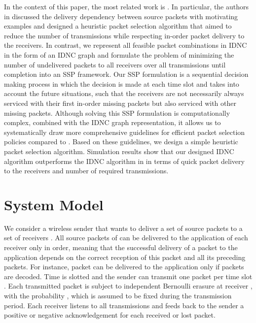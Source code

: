 \documentclass[12pt, peerreview, onecolumn]{IEEEtran}
\begin{document}
In the context of this paper, the most related work is \cite{wanginstantly}. In particular,  the authors in \cite{wanginstantly}  discussed the  delivery dependency between source packets with motivating examples  and  designed a heuristic packet selection algorithm that aimed to reduce the number of  transmissions  while respecting in-order packet delivery to the receivers. In contrast, we  represent all feasible packet combinations in IDNC in the form of an IDNC graph and formulate the problem of minimizing the  number of  undelivered packets to all receivers over all transmissions until completion into an SSP framework.  Our SSP formulation is a sequential decision making process in which  the decision is made at each time slot and  takes into account the future situations,  such that the  receivers  are not necessarily always serviced with their  first in-order missing packets but  also serviced with  other missing packets. Although solving this SSP formulation is computationally  complex,  combined with the IDNC graph representation, it allows us to systematically   draw more comprehensive
 guidelines  for  efficient packet selection policies compared to \cite{wanginstantly}. Based on these guidelines, we design  a simple heuristic packet selection  algorithm. Simulation results show that our designed IDNC algorithm  outperforms the IDNC algorithm in \cite{wanginstantly} in terms of quick packet   delivery  to the receivers and number of required transmissions.





\vspace{-5mm}
\section{System Model} \label{tools}
We consider a wireless sender that wants to  deliver a set   of  source packets   to a set  of  receivers .\footnotemark {} All source packets of  can be delivered to the application of each receiver only in order,  meaning that the successful delivery of a packet to the application  depends on the correct reception of this packet and all its preceding packets. For instance, packet  can be delivered to the application only if packets   are  decoded.   Time is slotted and the sender can transmit one packet per  time slot . Each transmitted packet is subject to independent Bernoulli erasure at receiver , with the probability , which is assumed to be fixed during the  transmission period.  Each receiver listens to all transmissions  and  feeds back to the sender a positive or negative acknowledgement for each received or lost packet.
\end{document}
